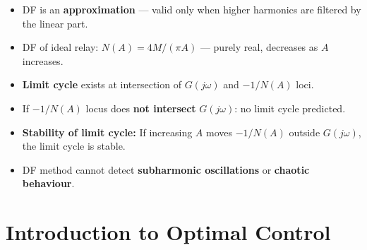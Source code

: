 \documentclass[12pt,a4paper]{article}
\begin{document}
\begin{tcolorbox}[tikzbox, title={Limit Cycle Prediction --- Graphical Method}]
\end{tcolorbox}

\begin{tcolorbox}[exambox, title={Exam Tips --- Describing Function}]
\begin{itemize}[leftmargin=*, itemsep=3pt, topsep=0pt]
  \item DF is an \textbf{approximation} --- valid only when higher harmonics are filtered by the linear part.
  \item DF of ideal relay: $N(A) = 4M/(\pi A)$ --- purely real, decreases as $A$ increases.
  \item \textbf{Limit cycle} exists at intersection of $G(j\omega)$ and $-1/N(A)$ loci.
  \item If $-1/N(A)$ locus does \textbf{not intersect} $G(j\omega)$: no limit cycle predicted.
  \item \textbf{Stability of limit cycle:} If increasing $A$ moves $-1/N(A)$ outside $G(j\omega)$, the limit cycle is stable.
  \item DF method cannot detect \textbf{subharmonic oscillations} or \textbf{chaotic behaviour}.
\end{itemize}
\end{tcolorbox}

\section{Introduction to Optimal Control}
\end{document}
